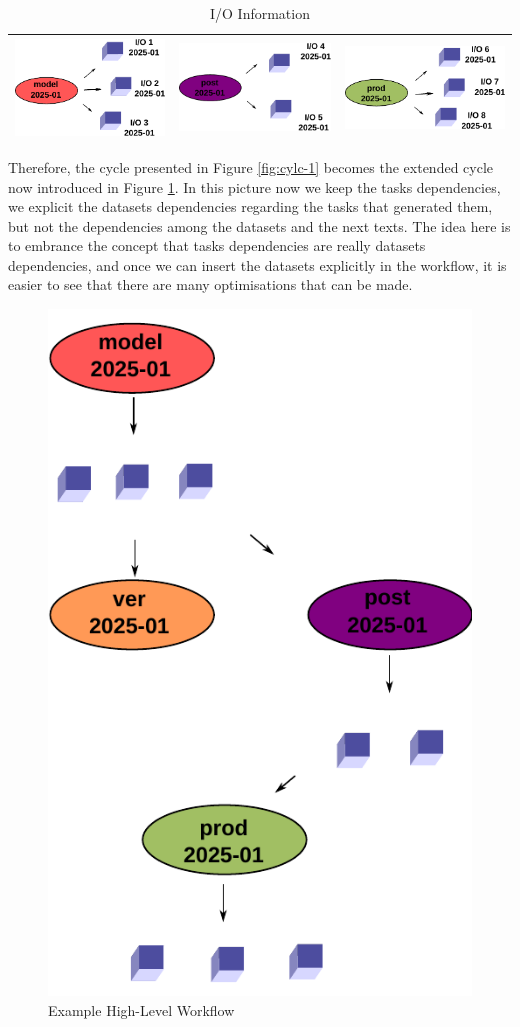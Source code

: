 \documentclass[a4paper]{article}
\begin{document}
\begin{table}[H]
\centering
\begin{tabular}{|c|c|c|}
\hline
  \includegraphics[width=0.3\columnwidth]{cylc-io-model} &
  \includegraphics[width=0.3\columnwidth]{cylc-io-post} &
  \includegraphics[width=0.3\columnwidth]{cylc-io-prod} \\
  \hline
\end{tabular}
\caption{I/O Information}
\label{tab:cylc}
\end{table}

Therefore, the cycle presented in Figure \ref{fig:cylc-1} becomes the extended cycle now introduced in Figure \ref{fig:cylc-io}. In this picture now we keep the tasks dependencies, we explicit the datasets dependencies regarding the tasks that generated them, but not the dependencies among the datasets and the next texts. The idea here is to embrance the concept that tasks dependencies are really datasets dependencies, and once we can insert the datasets explicitly in the workflow, it is easier to see that there are many optimisations that can be made.

\begin{figure}[H]
  \centering
  \includegraphics[width=0.4\columnwidth]{cylc-io}
  \caption{Example High-Level Workflow}
  \label{fig:cylc-io}
\end{figure}
\end{document}
